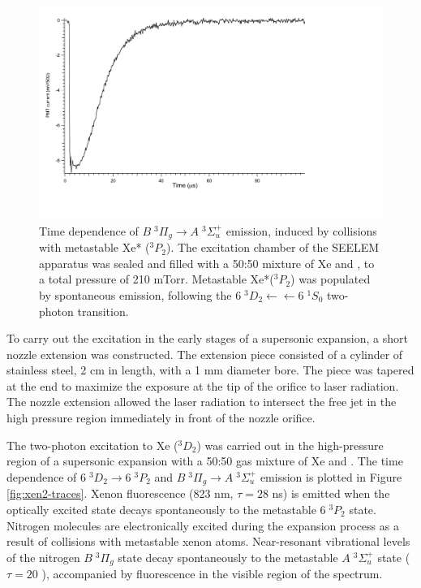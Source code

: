 \begin{figure}
  \caption{Time dependence of  $B \; ^3\Pi_g \rightarrow A \; ^3\Sigma_u^+$ emission,
    induced by collisions with metastable Xe* ($^3P_2$).  The
    excitation chamber of the SEELEM apparatus was sealed and filled
    with a 50:50 mixture of Xe and , to a total pressure of 210
    mTorr.  Metastable Xe*($^3P_2$) was populated by spontaneous
    emission, following the $6\;^3D_2 \leftarrow \leftarrow 6\;^1S_0$
    two-photon transition.}
  \label{fig:xen2-firstlight}
  \vspace{1cm}
  \centering
  \includegraphics[width=7in]{XeN2-firstlight.pdf}
  \vspace{2in}
\end{figure}

To carry out the excitation in the early stages of a supersonic
expansion, a short nozzle extension was constructed.  The extension
piece consisted of a cylinder of stainless steel, 2 cm in length, with
a 1 mm diameter bore.  The piece was tapered at the end to maximize
the exposure at the tip of the orifice to laser radiation.  The nozzle extension
allowed the laser radiation to intersect the free jet in the high
pressure region immediately in front of the nozzle orifice.

The two-photon excitation to Xe ($^3D_2$) was carried out in the
high-pressure region of a supersonic expansion with a 50:50 gas
mixture of Xe and .  The time dependence of  $6\;^3D_2
\rightarrow 6\;^3P_2$ and  $B \; ^3\Pi_g \rightarrow A \;
^3\Sigma_u^+$ emission is plotted in Figure \ref{fig:xen2-traces}.
Xenon fluorescence (823 nm, $\tau=28$ ns) is emitted when the
optically excited state decays spontaneously to the metastable
$6\;^3P_2$ state.  Nitrogen molecules are electronically excited
during the expansion process as a result of collisions with metastable
xenon atoms.  Near-resonant vibrational levels of the nitrogen $B \;
^3\Pi_g$ state decay spontaneously to the metastable $A \;
^3\Sigma_u^+$ state ($\tau=20$ \microsec), accompanied by fluorescence
in the visible region of the spectrum.

